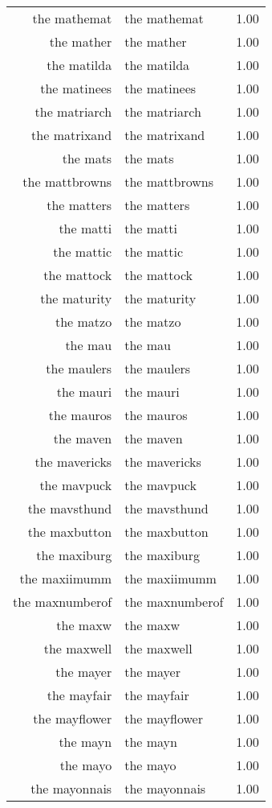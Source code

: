\begin{table}[ht]
\begin{tabular}{rlr}
  the mathemat & the mathemat & 1.00 \\ 
  the mather & the mather & 1.00 \\ 
  the matilda & the matilda & 1.00 \\ 
  the matinees & the matinees & 1.00 \\ 
  the matriarch & the matriarch & 1.00 \\ 
  the matrixand & the matrixand & 1.00 \\ 
  the mats & the mats & 1.00 \\ 
  the mattbrowns & the mattbrowns & 1.00 \\ 
  the matters & the matters & 1.00 \\ 
  the matti & the matti & 1.00 \\ 
  the mattic & the mattic & 1.00 \\ 
  the mattock & the mattock & 1.00 \\ 
  the maturity & the maturity & 1.00 \\ 
  the matzo & the matzo & 1.00 \\ 
  the mau & the mau & 1.00 \\ 
  the maulers & the maulers & 1.00 \\ 
  the mauri & the mauri & 1.00 \\ 
  the mauros & the mauros & 1.00 \\ 
  the maven & the maven & 1.00 \\ 
  the mavericks & the mavericks & 1.00 \\ 
  the mavpuck & the mavpuck & 1.00 \\ 
  the mavsthund & the mavsthund & 1.00 \\ 
  the maxbutton & the maxbutton & 1.00 \\ 
  the maxiburg & the maxiburg & 1.00 \\ 
  the maxiimumm & the maxiimumm & 1.00 \\ 
  the maxnumberof & the maxnumberof & 1.00 \\ 
  the maxw & the maxw & 1.00 \\ 
  the maxwell & the maxwell & 1.00 \\ 
  the mayer & the mayer & 1.00 \\ 
  the mayfair & the mayfair & 1.00 \\ 
  the mayflower & the mayflower & 1.00 \\ 
  the mayn & the mayn & 1.00 \\ 
  the mayo & the mayo & 1.00 \\ 
  the mayonnais & the mayonnais & 1.00 \\ 

\end{tabular}
\end{table}

